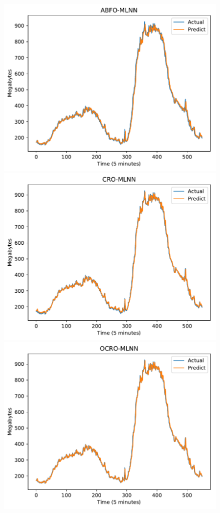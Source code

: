 \documentclass[11pt,twoside]{article}
\begin{document}
\begin{multicols}{2}
\begin{figure}[!ht]
   \begin{minipage}[b]{0.33\linewidth}
    \centering
    \includegraphics[width=0.9\linewidth]{images/pdf/predict/k2/eu_k2_abfo_mlnn.pdf} 
  \end{minipage}
  \begin{minipage}[b]{0.33\linewidth}
    \centering
    \includegraphics[width=0.9\linewidth]{images/pdf/predict/k2/eu_k2_cro_mlnn.pdf} 
  \end{minipage} 
  \begin{minipage}[b]{0.33\linewidth}
    \centering
    \includegraphics[width=0.9\linewidth]{images/pdf/predict/k2/eu_k2_ocro_mlnn.pdf} 

\end{minipage}
\end{figure}
\end{multicols}
\end{document}
